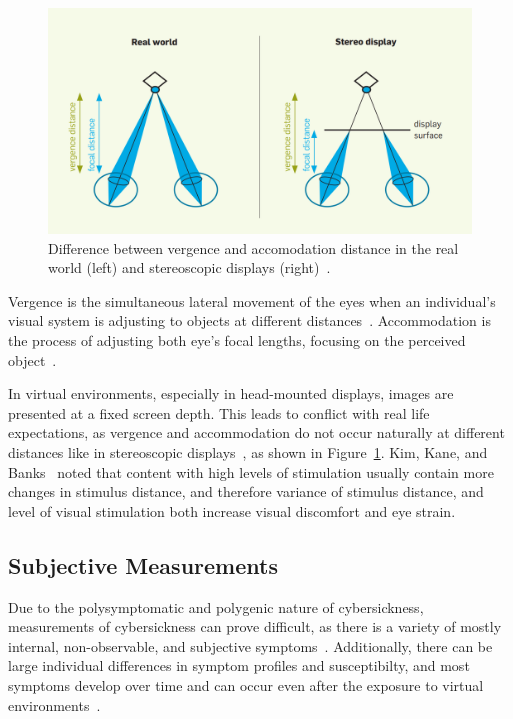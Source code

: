 \begin{figure}[h]
    \centering
    \includegraphics[width=\textwidth/2]{content/2_2_cybersickness/img/VergenceAccommodation[Kroeker2010]}
    \caption{Difference between vergence and accomodation distance in the real world (left) and stereoscopic displays
        (right)~\cite{Kroeker2010}.}
    \label{fig:vergence-accommodation-differences}
\end{figure}

Vergence is the simultaneous lateral movement of the eyes when an individual's visual system is adjusting to objects
at different distances~\cite{Kim2014}.
Accommodation is the process of adjusting both eye's focal lengths, focusing on the perceived
object~\cite{Rebenitsch2016}.

In virtual environments, especially in head-mounted displays, images are presented at a fixed screen depth.
This leads to conflict with real life expectations, as vergence and accommodation do not occur naturally at
different distances like in stereoscopic displays~\cite{Saredakis2020}, as shown in
Figure~\ref{fig:vergence-accommodation-differences}.
Kim, Kane, and Banks~\cite{Kim2014} noted that content with high levels of stimulation usually contain more changes
in stimulus distance, and therefore variance of stimulus distance, and level of visual stimulation both increase visual
discomfort and eye strain.


\subsection{Subjective Measurements}\label{subsec:subjective-measurements}

Due to the polysymptomatic and polygenic nature of cybersickness, measurements of cybersickness can prove
difficult, as there is a variety of mostly internal, non-observable, and subjective symptoms~\cite{McCauley1992}.
Additionally, there can be large individual differences in symptom profiles and susceptibilty, and most symptoms
develop over time and can occur even after the exposure to virtual environments~\cite{McCauley1992}.

